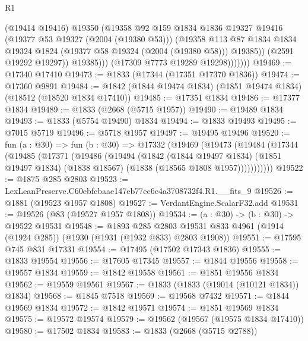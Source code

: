 \begin{lexlean}{R1}
\begin{coremodule}
                        (@19414 @19416)
                        @19350
                        (@19358
                          @92
                          @159
                          @1834
                          @1836
                          @19327
                          @19416
                          (@19377 @53 @19327 (@2004 (@19380 @53)))
                          (@19358
                            @113
                            @87
                            @1834
                            @1834
                            @19324
                            @1824
                            (@19377 @58 @19324 (@2004 (@19380 @58)))
                            @19385))
                        (@2591 @19292 @19297))
                      @19385)))
                (@17309 @7773 @19289 @19298)))))))
@19469 := @17340 @17410
@19473 := @1833 (@17344 (@17351 @17370 @1836))
@19474 := @17360 @9891
@19484 := @1842 (@1844 @19474 @1834) (@1851 @19474 @1834) (@18512 (@18520 @1834 @17410))
@19485 := @17351 @1834
@19486 := @17377 @1834
@19489 := @1833 (@2668 (@5715 @1957))
@19490 := @19489 @1834
@19493 := @1833 (@5754 @19490) @1834
@19494 := @1833 @19493
@19495 := @7015 @5719
@19496 := @5718 @1957
@19497 := @19495 @19496
@19520 := fun (a : @30) =>
  fun (b : @30) =>
  @17332
    (@19469
      (@19473
        (@19484
          (@17344
            (@19485
              (@17371
                (@19486
                  (@19494
                    (@1842
                      (@1844 @19497 @1834)
                      (@1851 @19497 @1834)
                      (@1838 @18567)
                      (@1838 (@18565 @1808 @1957)))))))))))
@19522 := @1875 @285 @2803
@19523 := LexLeanPreserve.C60ebfcbaae147eb77ec6e4a3708732f4.R1.__fits_9
@19526 := @1881 (@19523 @1957 @1808)
@19527 := VerdantEngine.ScalarF32.add
@19531 := @19526 (@83 (@19527 @1957 @1808))
@19534 := (a : @30) -> (b : @30) -> @19522 @19531
@19548 := @1893
    @285
    @2803
    @19531
    @833
    @4961
    (@1914 (@1924 @285))
    (@1930 (@1931 (@1932 @833) @2803 @1908))
@19551 := @17595 @745 @831 @17331
@19554 := @17495 (@17502 @17343 @1836)
@19555 := @1833 @19554
@19556 := @17605 @17345
@19557 := @1844 @19556
@19558 := @19557 @1834
@19559 := @1842 @19558
@19561 := @1851 @19556 @1834
@19562 := @19559 @19561
@19567 := @1833 (@1833 (@19014 (@10121 @1834)) @1834)
@19568 := @1845 @7518
@19569 := @19568 @7432
@19571 := @1844 @19569 @1834
@19572 := @1842 @19571
@19574 := @1851 @19569 @1834
@19575 := @19572 @19574
@19579 := @19562 (@19567 (@19575 @1834 @17410))
@19580 := @17502 @1834
@19583 := @1833 (@2668 (@5715 @2788))

\end{coremodule}
\end{lexlean}
